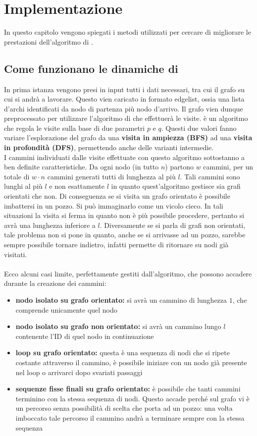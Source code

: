 %
%
%
\chapter{Implementazione}
In questo capitolo vengono spiegati i metodi utilizzati per cercare di migliorare le prestazioni dell'algoritmo di \cnrl \cite{CNRL_code}.
%
\section{Come funzionano le dinamiche di \cnrl}
In prima istanza vengono presi in input tutti i dati necessari, tra cui il grafo su cui si andrà a lavorare. Questo vien caricato in formato edgelist, ossia una lista d'archi identificati da nodo di partenza più nodo d'arrivo. Il grafo vien dunque preprocessato per utilizzare l'algoritmo di \nv che effettuerà le visite. \nv è un algoritmo che regola le visite sulla base di due parametri $p$ e $q$. Questi due valori fanno variare l'esplorazione del grafo da una \textbf{visita in ampiezza (BFS)} ad una \textbf{visita in profondità (DFS)}, permettendo anche delle varianti intermedie.\\
I cammini individuati dalle visite effettuate con questo algoritmo sottostanno a ben definite caratteristiche. Da ogni nodo (in tutto $n$) partono $w$ cammini, per un totale di $w \cdot n$ cammini generati tutti di lunghezza al più $l$. Tali cammini sono lunghi al più  $l$ e non esattamente $l$ in quanto quest'algoritmo gestisce sia grafi orientati che non. Di conseguenza se si visita un grafo orientato è possibile imbattersi in un pozzo. Si può immaginarlo come un vicolo cieco. In tali situazioni la visita si ferma in quanto non è più possibile procedere, pertanto si avrà una lunghezza inferiore a $l$. Diversamente se si parla di grafi non orientati, tale problema non si pone in quanto, anche se si arrivasse ad un pozzo, sarebbe sempre possibile tornare indietro, infatti \nv permette di ritornare su nodi già visitati.\\
\\
Ecco alcuni casi limite, perfettamente gestiti dall'algoritmo, che possono accadere durante la creazione dei cammini:
\begin{itemize}
	\item \textbf{nodo isolato su grafo orientato:} si avrà un cammino di lunghezza $1$, che comprende unicamente quel nodo
	\item \textbf{nodo isolato su grafo non orientato:} si avrà un cammino lungo $l$ contenente l'ID di quel nodo in continuazione
	\item \textbf{loop su grafo orientato:} questa è una sequenza di nodi che si ripete costante attraverso il cammino, è possibile iniziare con un nodo già presente nel loop o arrivarci dopo svariati passaggi
	\item \textbf{sequenze fisse finali su grafo orientato:} è possibile che tanti cammini terminino con la stessa sequenza di nodi. Questo accade perché sul grafo vi è un percorso senza possibilità di scelta che porta ad un pozzo: una volta imboccato tale percorso il cammino andrà a terminare sempre con la stessa sequenza
\end{itemize}
